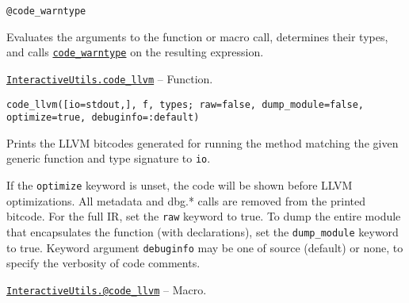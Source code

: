 \begin{adjustwidth}{2em}{0pt}


\begin{verbatim}
@code_warntype
\end{verbatim}

Evaluates the arguments to the function or macro call, determines their types, and calls \hyperlink{5565852192659724503}{\texttt{code\_warntype}} on the resulting expression.



\end{adjustwidth}
\hypertarget{1749471484368489435}{}
\hyperlink{1749471484368489435}{\texttt{InteractiveUtils.code\_llvm}}  -- {Function.}

\begin{adjustwidth}{2em}{0pt}


\begin{verbatim}
code_llvm([io=stdout,], f, types; raw=false, dump_module=false, optimize=true, debuginfo=:default)
\end{verbatim}

Prints the LLVM bitcodes generated for running the method matching the given generic function and type signature to \texttt{io}.

If the \texttt{optimize} keyword is unset, the code will be shown before LLVM optimizations. All metadata and dbg.* calls are removed from the printed bitcode. For the full IR, set the \texttt{raw} keyword to true. To dump the entire module that encapsulates the function (with declarations), set the \texttt{dump\_module} keyword to true. Keyword argument \texttt{debuginfo} may be one of source (default) or none, to specify the verbosity of code comments.



\end{adjustwidth}
\hypertarget{18039596607712979441}{}
\hyperlink{18039596607712979441}{\texttt{InteractiveUtils.@code\_llvm}}  -- {Macro.}


